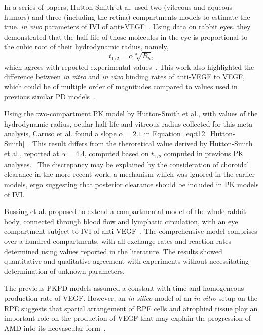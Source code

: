 \documentclass[12pt,a4paper]{journal}
\begin{document}
In a series of papers, Hutton-Smith et al. used two (vitreous and aqueous humors) and three (including the retina) compartments models to estimate the true, \textit{in vivo} parameters of IVI of anti-VEGF~\cite{HuttonSmith_2016,HuttonSmith_2017,HuttonSmith_2018}.
Using data on rabbit eyes, they demonstrated that the half-life of those molecules in the eye is proportional to the cubic root of their hydrodynamic radius, namely,
\begin{equation}
  \label{eq:t12_Hutton-Smith}
  t_{1/2} = \alpha\sqrt[3]{R_h},
\end{equation}
which agrees with reported experimental values~\cite{HuttonSmith_2016}.
This work also highlighted the difference between \textit{in vitro} and \textit{in vivo} binding rates of anti-VEGF to VEGF, which could be of multiple order of magnitudes compared to values used in previous similar PD models~\cite{Saunders_2015}.

Using the two-compartment PK model by Hutton-Smith et al., with values of the hydrodynamic radius, ocular half-life and vitreous radius collected for this meta-analysis, Caruso et al. found a slope $\alpha=2.1$ in Equation~\ref{eq:t12_Hutton-Smith}~\cite{Caruso_2020}.
This result differs from the theroretical value derived by Hutton-Smith et al., reported at $\alpha=4.4$, computed based on $t_{1/2}$ computed in previous PK analyses.~\cite{HuttonSmith_2016}
The discrepancy may be explained by the consideration of choroidal clearance in the more recent work, a mechanism which was ignored in the earlier models, ergo suggesting that posterior clearance should be included in PK models of IVI.


Bussing et al. proposed to extend a compartmental model of the whole rabbit body, connected through blood flow and lymphatic circulation, with an eye compartment subject to IVI of anti-VEGF~\cite{Bussing_2020}.
The comprehensive model comprises over a hundred compartments, with all exchange rates and reaction rates determined using values reported in the literature.
The results showed quantitative and qualitative agreement with experiments without necessitating determination of unknown parameters. 

The previous PKPD models assumed a constant with time and homogeneous production rate of VEGF.
However, an \textit{in silico} model of an \textit{in vitro} setup on the RPE suggests that spatial arrangement of RPE cells and atrophied tissue play an important role on the production of VEGF that may explain the progression of AMD into its neovascular form~\cite{Baker_2017}.  
\end{document}
